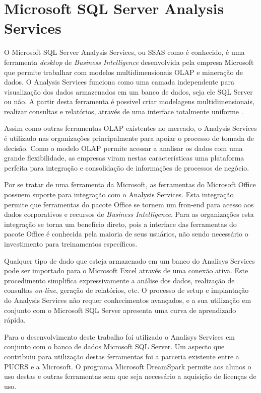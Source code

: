 \section{Microsoft SQL Server Analysis Services}
O Microsoft SQL Server Analysis Services, ou SSAS como é conhecido, é uma ferramenta \emph{desktop} de \emph{Business Intelligence} desenvolvida pela empresa Microsoft que permite trabalhar com modelos multidimensionais OLAP e mineração de dados. O Analysis Services funciona como uma camada independente para visualização dos dados armazenados em um banco de dados, seja ele SQL Server ou não. A partir desta ferramenta é possivel criar modelagens multidimensionais, realizar consultas e relatórios, através de uma interface totalmente uniforme \cite{MIC13}.

Assim como outras ferramentas OLAP existentes no mercado, o Analysis Services é utilizado nas organizações principalmente para apoiar o processo de tomada de decisão. Como o modelo OLAP permite acessar a analisar os dados com uma grande flexibilidade, as empresas viram nestas características uma plataforma perfeita para integração e consolidação de informações de processos de negócio.

Por se tratar de uma ferramenta da Microsoft, as ferramentas do Microsoft Office possuem suporte para integração com o Analysis Services. Esta integração permite que ferramentas do pacote Office se tornem um fron-end para acesso aos dados corporativos e recursos de \emph{Business Intelligence}. Para as organizações esta integração se torna um benefício direto, pois a interface das ferramentas do pacote Office é conhecida pela maioria de seus usuários, não sendo necessário o investimento para treinamentos específicos.

Qualquer tipo de dado que esteja armazenado em um banco do Analisys Services pode ser importado para o Microsoft Excel através de uma conexão ativa. Este procedimento simplifica expressivamente a análise dos dados, realização de consultas \emph{on-line}, geração de relatórios, etc. O processo de setup e implantação do Analysis Services não requer conhecimentos avançados, e a sua utilização em conjunto com o Microsoft SQL Server apresenta uma curva de aprendizado rápida.

Para o desenvolvimento deste trabalho foi utilizado o Analisys Services em conjunto com o banco de dados Microsoft SQL Server. Um aspecto que contribuiu para utilização destas ferramentas foi a parceria existente entre a PUCRS e a Microsoft. O programa Microsoft DreamSpark permite aos alunos o uso destas e outras ferramentas sem que seja necessário a aquisição de licenças de uso.

